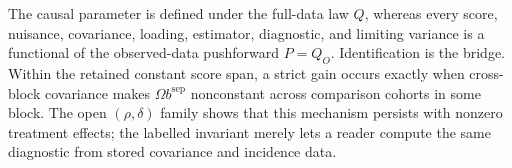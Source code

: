 The causal parameter is defined under the full-data law \(Q\), whereas every score, nuisance, covariance, loading, estimator, diagnostic, and limiting variance is a functional of the observed-data pushforward \(P=Q_O\). Identification is the bridge. Within the retained constant score span, a strict gain occurs exactly when cross-block covariance makes \(\Omega b^{\mathrm{sep}}\) nonconstant across comparison cohorts in some block. The open \((\rho,\delta)\) family shows that this mechanism persists with nonzero treatment effects; the labelled invariant merely lets a reader compute the same diagnostic from stored covariance and incidence data.